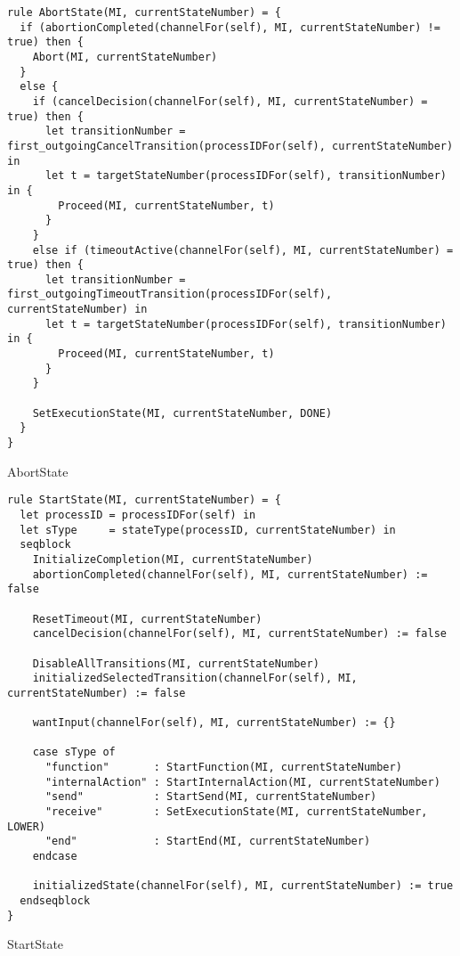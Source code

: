 \begin{listing}[H]
\begin{verbatim}
rule AbortState(MI, currentStateNumber) = {
  if (abortionCompleted(channelFor(self), MI, currentStateNumber) != true) then {
    Abort(MI, currentStateNumber)
  }
  else {
    if (cancelDecision(channelFor(self), MI, currentStateNumber) = true) then {
      let transitionNumber = first_outgoingCancelTransition(processIDFor(self), currentStateNumber) in
      let t = targetStateNumber(processIDFor(self), transitionNumber) in {
        Proceed(MI, currentStateNumber, t)
      }
    }
    else if (timeoutActive(channelFor(self), MI, currentStateNumber) = true) then {
      let transitionNumber = first_outgoingTimeoutTransition(processIDFor(self), currentStateNumber) in
      let t = targetStateNumber(processIDFor(self), transitionNumber) in {
        Proceed(MI, currentStateNumber, t)
      }
    }

    SetExecutionState(MI, currentStateNumber, DONE)
  }
}
\end{verbatim}
\caption{AbortState}
\label{lst:asm:AbortState}
\end{listing}




\begin{listing}[H]
\begin{verbatim}
rule StartState(MI, currentStateNumber) = {
  let processID = processIDFor(self) in
  let sType     = stateType(processID, currentStateNumber) in
  seqblock
    InitializeCompletion(MI, currentStateNumber)
    abortionCompleted(channelFor(self), MI, currentStateNumber) := false

    ResetTimeout(MI, currentStateNumber)
    cancelDecision(channelFor(self), MI, currentStateNumber) := false

    DisableAllTransitions(MI, currentStateNumber)
    initializedSelectedTransition(channelFor(self), MI, currentStateNumber) := false

    wantInput(channelFor(self), MI, currentStateNumber) := {}

    case sType of
      "function"       : StartFunction(MI, currentStateNumber)
      "internalAction" : StartInternalAction(MI, currentStateNumber)
      "send"           : StartSend(MI, currentStateNumber)
      "receive"        : SetExecutionState(MI, currentStateNumber, LOWER)
      "end"            : StartEnd(MI, currentStateNumber)
    endcase

    initializedState(channelFor(self), MI, currentStateNumber) := true
  endseqblock
}
\end{verbatim}
\caption{StartState}
\label{lst:asm:StartState}
\end{listing}




